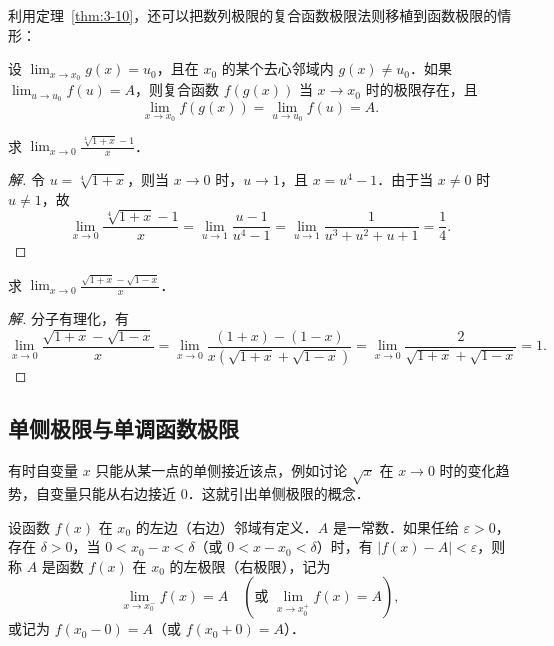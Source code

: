 利用定理~\ref{thm:3-10}，还可以把数列极限的复合函数极限法则移植到函数极限的情形：

\begin{theorem}[复合函数的极限]\label{thm:3-11}
设 $\lim_{x \to x_0} g(x) = u_0$，且在 $x_0$ 的某个去心邻域内 $g(x) \neq u_0$．如果 $\lim_{u \to u_0} f(u) = A$，则复合函数 $f(g(x))$ 当 $x \to x_0$ 时的极限存在，且
\[
\lim_{x \to x_0} f(g(x)) = \lim_{u \to u_0} f(u) = A.
\]
\end{theorem}

\begin{example}\label{ex:3-3-5}
求 $\lim_{x \to 0} \frac{\sqrt[4]{1+x} - 1}{x}$．
\end{example}

\begin{proof}[解]
令 $u = \sqrt[4]{1+x}$，则当 $x \to 0$ 时，$u \to 1$，且 $x = u^4 - 1$．由于当 $x \neq 0$ 时 $u \neq 1$，故
\[
\lim_{x \to 0} \frac{\sqrt[4]{1+x} - 1}{x} = \lim_{u \to 1} \frac{u - 1}{u^4 - 1} = \lim_{u \to 1} \frac{1}{u^3 + u^2 + u + 1} = \frac{1}{4}.
\]
\end{proof}

\begin{example}\label{ex:3-3-6}
求 $\lim_{x \to 0} \frac{\sqrt{1+x} - \sqrt{1-x}}{x}$．
\end{example}

\begin{proof}[解]
分子有理化，有
\[
\lim_{x \to 0} \frac{\sqrt{1+x} - \sqrt{1-x}}{x} = \lim_{x \to 0} \frac{(1+x) - (1-x)}{x(\sqrt{1+x} + \sqrt{1-x})} = \lim_{x \to 0} \frac{2}{\sqrt{1+x} + \sqrt{1-x}} = 1.
\]
\end{proof}

\subsection*{单侧极限与单调函数极限}

有时自变量 $x$ 只能从某一点的单侧接近该点，例如讨论 $\sqrt{x}$ 在 $x \to 0$ 时的变化趋势，自变量只能从右边接近 $0$．这就引出单侧极限的概念．

\begin{definition}\label{def:3-6}
设函数 $f(x)$ 在 $x_0$ 的左边（右边）邻域有定义．$A$ 是一常数．如果任给 $\varepsilon > 0$，存在 $\delta > 0$，当 $0 < x_0 - x < \delta$（或 $0 < x - x_0 < \delta$）时，有 $|f(x) - A| < \varepsilon$，则称 $A$ 是函数 $f(x)$ 在 $x_0$ 的左极限（右极限），记为
\[
\lim_{x \to x_0^-} f(x) = A \quad (\text{或 } \lim_{x \to x_0^+} f(x) = A),
\]
或记为 $f(x_0 - 0) = A$（或 $f(x_0 + 0) = A$）．
\end{definition}

